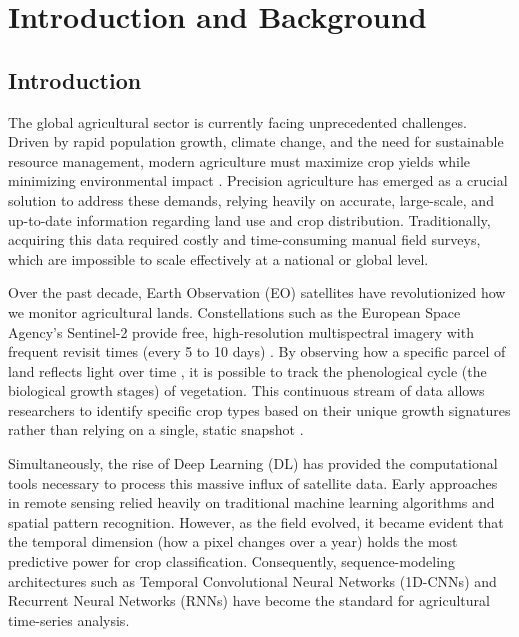 \chapter{Introduction and Background}
\label{cha:intro}


\section{Introduction}
\label{sec:context}

The global agricultural sector is currently facing unprecedented challenges. Driven by rapid population growth, climate change,
and the need for sustainable resource management, modern agriculture must maximize crop yields while minimizing environmental impact \cite{fao_2017_future}.
Precision agriculture \cite{precision_farming_1, precision_farming_2} has emerged as a crucial solution to address these demands,
relying heavily on accurate, large-scale, and up-to-date information regarding land use and crop distribution.
Traditionally, acquiring this data required costly and time-consuming manual field surveys,
which are impossible to scale effectively at a national or global level.

Over the past decade, Earth Observation (EO) satellites have revolutionized how we monitor agricultural lands.
Constellations such as the European Space Agency’s Sentinel-2 provide free,
high-resolution multispectral imagery with frequent revisit times (every 5 to 10 days) \cite{drusch_sentinel2_2012}.
By observing how a specific parcel of land reflects light over time \cite{tucker_1979},
it is possible to track the phenological cycle (the biological growth stages) of vegetation.
This continuous stream of data allows researchers to identify specific crop types based on their unique growth signatures rather than relying on a single,
static snapshot \cite{zeng_phenology_2020}.

Simultaneously, the rise of Deep Learning (DL) has provided the computational tools necessary to process this massive influx of satellite data.
Early approaches in remote sensing relied heavily on traditional machine learning algorithms and spatial pattern recognition.
However, as the field evolved, it became evident that the temporal dimension (how a
pixel changes over a year) holds the most predictive power for crop classification.
Consequently, sequence-modeling architectures such as Temporal Convolutional Neural Networks (1D-CNNs)
\cite{kussul_deep_2017, pelletier_temporal_2019} and Recurrent Neural Networks (RNNs)
\cite{rnn_1} have become the standard for agricultural time-series analysis.


